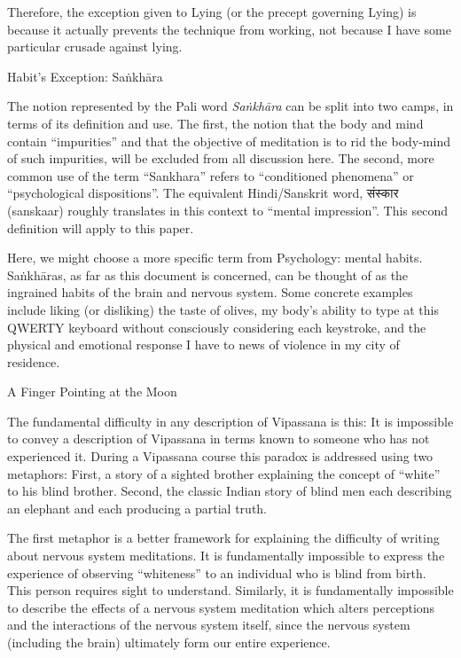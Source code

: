 \documentclass{article}
\begin{document}
Therefore, the exception given to Lying (or the precept governing Lying) is because it actually prevents the technique from working, not because I have some particular crusade against lying.

\vspace{1cm}

\begin{center}
  \LARGE{Habit's Exception: Saṅkhāra}
\end{center}

The notion represented by the Pali word \textit{Saṅkhāra} can be split into two camps, in terms of its definition and use. The first, the notion that the body and mind contain ``impurities'' and that the objective of meditation is to rid the body-mind of such impurities, will be excluded from all discussion here. The second, more common use of the term ``Sankhara'' refers to ``conditioned phenomena'' or ``psychological dispositions''. The equivalent Hindi/Sanskrit word, \foreignlanguage{sanskrit}{संस्कार} (sanskaar) roughly translates in this context to ``mental impression''. This second definition will apply to this paper.

Here, we might choose a more specific term from Psychology: mental habits. Saṅkhāras, as far as this document is concerned, can be thought of as the ingrained habits of the brain and nervous system. Some concrete examples include liking (or disliking) the taste of olives, my body's ability to type at this QWERTY keyboard without consciously considering each keystroke, and the physical and emotional response I have to news of violence in my city of residence.

\pagebreak

\begin{center}
  \Huge{A Finger Pointing at the Moon}
\end{center}

The fundamental difficulty in any description of Vipassana is this: It is impossible to convey a description of Vipassana in terms known to someone who has not experienced it. During a Vipassana course this paradox is addressed using two metaphors: First, a story of a sighted brother explaining the concept of ``white'' to his blind brother. \cite{experiencethetruth} Second, the classic Indian story of blind men each describing an elephant and each producing a partial truth.

The first metaphor is a better framework for explaining the difficulty of writing about nervous system meditations. It is fundamentally impossible to express the experience of observing ``whiteness'' to an individual who is blind from birth. This person requires sight to understand. Similarly, it is fundamentally impossible to describe the effects of a nervous system meditation which alters perceptions and the interactions of the nervous system itself, since the nervous system (including the brain) ultimately form our entire experience.
\end{document}
